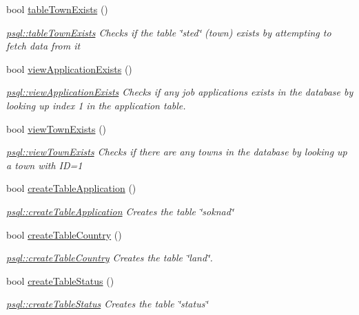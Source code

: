 \begin{DoxyCompactItemize}
bool \hyperlink{classpsql_a717162b7d7faa0fb41b5a526e42de4ac}{table\+Town\+Exists} ()
\begin{DoxyCompactList}\small\item\em \hyperlink{classpsql_a717162b7d7faa0fb41b5a526e42de4ac}{psql\+::table\+Town\+Exists} Checks if the table \char`\"{}sted\char`\"{} (town) exists by attempting to fetch data from it \end{DoxyCompactList}\item 
bool \hyperlink{classpsql_a4c23d467c41e155a55c38b1cefb9b54b}{view\+Application\+Exists} ()
\begin{DoxyCompactList}\small\item\em \hyperlink{classpsql_a4c23d467c41e155a55c38b1cefb9b54b}{psql\+::view\+Application\+Exists} Checks if any job applications exists in the database by looking up index 1 in the application table. \end{DoxyCompactList}\item 
bool \hyperlink{classpsql_aae95eb2a505c1b0b7b4d5671926ecd2f}{view\+Town\+Exists} ()
\begin{DoxyCompactList}\small\item\em \hyperlink{classpsql_aae95eb2a505c1b0b7b4d5671926ecd2f}{psql\+::view\+Town\+Exists} Checks if there are any towns in the database by looking up a town with ID=1 \end{DoxyCompactList}\item 
bool \hyperlink{classpsql_a36f6a197a2214b9c71cfcd620334835d}{create\+Table\+Application} ()
\begin{DoxyCompactList}\small\item\em \hyperlink{classpsql_a36f6a197a2214b9c71cfcd620334835d}{psql\+::create\+Table\+Application} Creates the table \char`\"{}soknad\char`\"{} \end{DoxyCompactList}\item 
bool \hyperlink{classpsql_ab6e496d8471f3cd9c5c082a6ba75c25b}{create\+Table\+Country} ()
\begin{DoxyCompactList}\small\item\em \hyperlink{classpsql_ab6e496d8471f3cd9c5c082a6ba75c25b}{psql\+::create\+Table\+Country} Creates the table \char`\"{}land\char`\"{}. \end{DoxyCompactList}\item 
bool \hyperlink{classpsql_a427ad0f483c8ab7a4d23912278bc69e8}{create\+Table\+Status} ()
\begin{DoxyCompactList}\small\item\em \hyperlink{classpsql_a427ad0f483c8ab7a4d23912278bc69e8}{psql\+::create\+Table\+Status} Creates the table \char`\"{}status\char`\"{} \end{DoxyCompactList}\item 

\end{DoxyCompactItemize}
